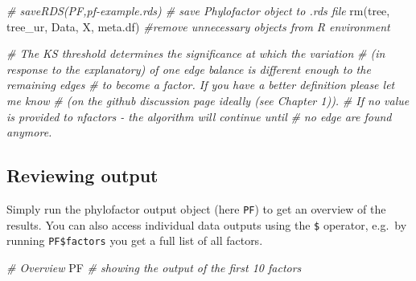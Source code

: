 \documentclass[
]{book}
\newenvironment{Shaded}{\begin{snugshade}}{\end{snugshade}}
\newcommand{\CommentTok}[1]{\textcolor[rgb]{0.56,0.35,0.01}{\textit{#1}}}
\newcommand{\FunctionTok}[1]{\textcolor[rgb]{0.00,0.00,0.00}{#1}}
\newcommand{\NormalTok}[1]{#1}
\begin{document}
\begin{Shaded}
\begin{Highlighting}[]
\CommentTok{\# saveRDS(PF,\textquotesingle{}pf{-}example.rds\textquotesingle{})  \# save Phylofactor object to .rds file }
\FunctionTok{rm}\NormalTok{(tree, tree\_ur, Data, X, meta.df) }\CommentTok{\#remove unnecessary objects from R environment}

\CommentTok{\# The KS threshold determines the significance at which the variation }
\CommentTok{\# (in response to the explanatory) of one edge balance is different enough to the remaining edges }
\CommentTok{\# to become a factor. If you have a better definition please let me know }
\CommentTok{\# (on the github discussion page ideally (see Chapter 1)).   }
\CommentTok{\# If no value is provided to nfactors {-} the algorithm will continue until }
\CommentTok{\# no edge are found anymore.}
\end{Highlighting}
\end{Shaded}

\hypertarget{reviewing-output}{%
\subsection{Reviewing output}\label{reviewing-output}}

Simply run the phylofactor output object (here \texttt{PF}) to get an overview of the results. You can also access individual data outputs using the \texttt{\$} operator, e.g.~by running \texttt{PF\$factors} you get a full list of all factors.

\begin{Shaded}
\begin{Highlighting}[]
\CommentTok{\# Overview}
\NormalTok{PF }\CommentTok{\# showing the output of the first 10 factors }
\end{Highlighting}
\end{Shaded}
\end{document}
